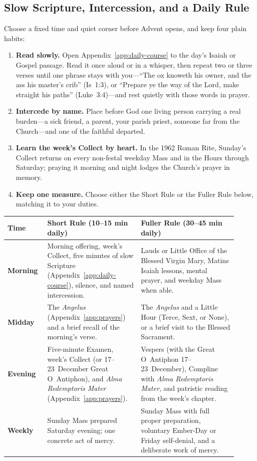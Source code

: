 \subsection{Slow Scripture, Intercession, and a Daily Rule}

Choose a fixed time and quiet corner before Advent opens, and keep four plain habits:

\begin{enumerate}
\item \textbf{Read slowly.} Open Appendix~\ref{app:daily-course} to the day's Isaiah or Gospel passage. Read it once aloud or in a whisper, then repeat two or three verses until one phrase stays with you---``The ox knoweth his owner, and the ass his master's crib'' (Is~1:3), or ``Prepare ye the way of the Lord, make straight his paths'' (Luke~3:4)---and rest quietly with those words in prayer.
\item \textbf{Intercede by name.} Place before God one living person carrying a real burden---a sick friend, a parent, your parish priest, someone far from the Church---and one of the faithful departed.
\item \textbf{Learn the week's Collect by heart.} In the 1962 Roman Rite, Sunday's Collect returns on every non-festal weekday Mass and in the Hours through Saturday; praying it morning and night lodges the Church's prayer in memory.
\item \textbf{Keep one measure.} Choose either the Short Rule or the Fuller Rule below, matching it to your duties.
\end{enumerate}

\begin{longtable}{>{\raggedright\arraybackslash}p{0.15\linewidth}>{\raggedright\arraybackslash}p{0.37\linewidth}>{\raggedright\arraybackslash}p{0.39\linewidth}}
\toprule
\textbf{Time} & \textbf{Short Rule (10--15 min daily)} & \textbf{Fuller Rule (30--45 min daily)} \\
\midrule
\endhead
\textbf{Morning} & Morning offering, week's Collect, five minutes of slow Scripture (Appendix~\ref{app:daily-course}), silence, and named intercession. & Lauds or Little Office of the Blessed Virgin Mary, Matins Isaiah lessons, mental prayer, and weekday Mass when able. \\
\textbf{Midday} & The \textit{Angelus} (Appendix~\ref{app:prayers}) and a brief recall of the morning's verse. & The \textit{Angelus} and a Little Hour (Terce, Sext, or None), or a brief visit to the Blessed Sacrament. \\
\textbf{Evening} & Five-minute Examen, week's Collect (or 17--23~December Great O~Antiphon), and \textit{Alma Redemptoris Mater} (Appendix~\ref{app:prayers}). & Vespers (with the Great O~Antiphon 17--23~December), Compline with \textit{Alma Redemptoris Mater}, and patristic reading from the week's chapter. \\
\textbf{Weekly} & Sunday Mass prepared Saturday evening; one concrete act of mercy. & Sunday Mass with full proper preparation, voluntary Ember-Day or Friday self-denial, and a deliberate work of mercy. \\
\bottomrule
\end{longtable}

